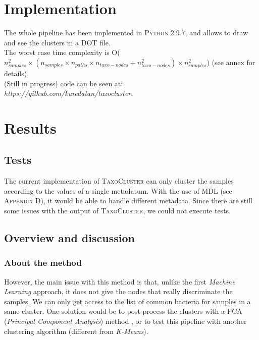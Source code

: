 \documentclass{report}
\begin{document}
\section{Implementation}

The whole pipeline has been implemented in \textsc{Python 2.9.7}, and allows to draw and see the clusters in a \textsc{DOT} file.\\

The worst case time complexity is O($n_{samples}^{2} \times (n_{samples} \times n_{paths} \times n_{taxo-nodes} + n_{taxo-nodes}^{2}) \times n_{samples}^{2}$) (see annex for details).\\

(Still in progress) code can be seen at: \\\emph{https://github.com/kuredatan/taxocluster}.

\section{Results}

\subsection{Tests}

The current implementation of \textsc{TaxoCluster} can only cluster the samples according to the values of a single metadatum. With the use of \textsc{MDL} (see \textsc{Appendix D}), it would be able to handle different metadata. Since there are still some issues with the output of \textsc{TaxoCluster}, we could not execute tests.\\

\subsection{Overview and discussion}

\subsubsection{About the method}

However, the main issue with this method is that, unlike the first \emph{Machine Learning} approach, it does not give the nodes that really discriminate the samples. We can only get access to the list of common bacteria for samples in a same cluster. One solution would be to post-process the clusters with a \textsc{PCA} (\emph{Principal Component Analysis}) method \cite{PCA}, or to test this pipeline with another clustering algorithm (different from \emph{K-Means}).
\end{document}
